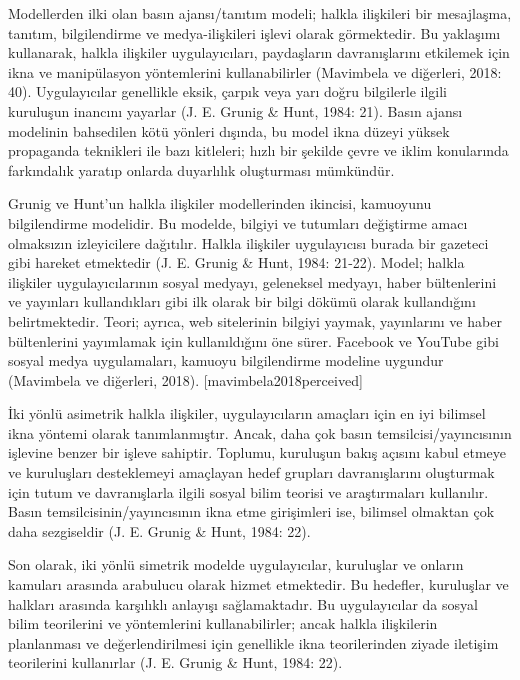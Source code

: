 \documentclass[
]{book}
\begin{document}
Modellerden ilki olan basın ajansı/tanıtım modeli; halkla ilişkileri bir mesajlaşma, tanıtım, bilgilendirme ve medya-ilişkileri işlevi olarak görmektedir. Bu yaklaşımı kullanarak, halkla ilişkiler uygulayıcıları, paydaşların davranışlarını etkilemek için ikna ve manipülasyon yöntemlerini kullanabilirler (Mavimbela ve diğerleri, 2018: 40). Uygulayıcılar genellikle eksik, çarpık veya yarı doğru bilgilerle ilgili kuruluşun inancını yayarlar (J. E. Grunig \& Hunt, 1984: 21). \citep{grunig1984managing} Basın ajansı modelinin bahsedilen kötü yönleri dışında, bu model ikna düzeyi yüksek propaganda teknikleri ile bazı kitleleri; hızlı bir şekilde çevre ve iklim konularında farkındalık yaratıp onlarda duyarlılık oluşturması mümkündür.

Grunig ve Hunt'un halkla ilişkiler modellerinden ikincisi, kamuoyunu bilgilendirme modelidir. Bu modelde, bilgiyi ve tutumları değiştirme amacı olmaksızın izleyicilere dağıtılır. Halkla ilişkiler uygulayıcısı burada bir gazeteci gibi hareket etmektedir (J. E. Grunig \& Hunt, 1984: 21-22). Model; halkla ilişkiler uygulayıcılarının sosyal medyayı, geleneksel medyayı, haber bültenlerini ve yayınları kullandıkları gibi ilk olarak bir bilgi dökümü olarak kullandığını belirtmektedir. Teori; ayrıca, web sitelerinin bilgiyi yaymak, yayınlarını ve haber bültenlerini yayımlamak için kullanıldığını öne sürer. Facebook ve YouTube gibi sosyal medya uygulamaları, kamuoyu bilgilendirme modeline uygundur (Mavimbela ve diğerleri, 2018). {[}mavimbela2018perceived{]}

İki yönlü asimetrik halkla ilişkiler, uygulayıcıların amaçları için en iyi bilimsel ikna yöntemi olarak tanımlanmıştır. Ancak, daha çok basın temsilcisi/yayıncısının işlevine benzer bir işleve sahiptir. Toplumu, kuruluşun bakış açısını kabul etmeye ve kuruluşları desteklemeyi amaçlayan hedef grupları davranışlarını oluşturmak için tutum ve davranışlarla ilgili sosyal bilim teorisi ve araştırmaları kullanılır. Basın temsilcisinin/yayıncısının ikna etme girişimleri ise, bilimsel olmaktan çok daha sezgiseldir (J. E. Grunig \& Hunt, 1984: 22). \citep{grunig1984managing}

Son olarak, iki yönlü simetrik modelde uygulayıcılar, kuruluşlar ve onların kamuları arasında arabulucu olarak hizmet etmektedir. Bu hedefler, kuruluşlar ve halkları arasında karşılıklı anlayışı sağlamaktadır. Bu uygulayıcılar da sosyal bilim teorilerini ve yöntemlerini kullanabilirler; ancak halkla ilişkilerin planlanması ve değerlendirilmesi için genellikle ikna teorilerinden ziyade iletişim teorilerini kullanırlar (J. E. Grunig \& Hunt, 1984: 22). \citep{grunig1984managing}
\end{document}
